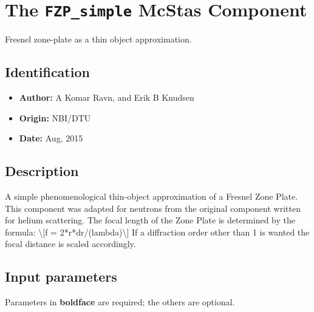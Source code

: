 \section{The \texttt{FZP\_simple} McStas Component}
Fresnel zone-plate as a thin object approximation.

\subsection*{Identification}
\begin{itemize}
  \item \textbf{Author:} A Komar Ravn, and Erik B Knudsen
  \item \textbf{Origin:} NBI/DTU
  \item \textbf{Date:} Aug, 2015
\end{itemize}

\subsection*{Description}
A simple phenomenological thin-object approximation of a Fresnel Zone Plate. This component was adapted for neutrons from the original component written for helium scattering. The focal length of the Zone Plate is determined by the formula: \textbackslash{}[f = 2*r*dr/(lambda)\textbackslash{}] If a diffraction order other than 1 is wanted the focal distance is scaled accordingly.

\subsection*{Input parameters}
Parameters in \textbf{boldface} are required; the others are optional.

